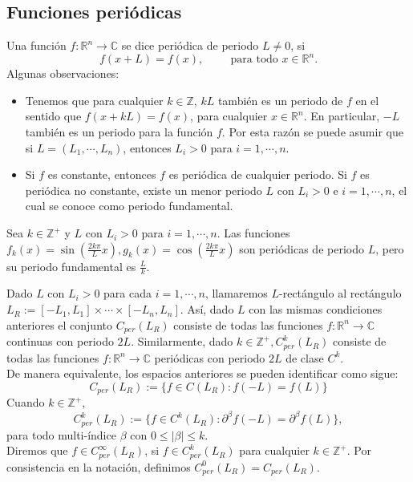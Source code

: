   \subsection{Funciones periódicas}\label{subsec:funciones-periodicas}
    Una función $f: \mathbb{R}^{n}\rightarrow \mathbb{C}$ se dice periódica de periodo $L\neq 0$, si
    $$f(x+L)=f(x),\hspace{1cm}\text{para todo $x\in\mathbb{R}^{n}$.}$$
    Algunas observaciones:
    \begin{itemize}
      \item Tenemos que para cualquier $k\in \mathbb{Z}$, $kL$ también es un periodo de $f$ en el sentido que $f(x + kL) = f(x)$, para cualquier $x \in \mathbb{R}^{n}$. En particular, $-L$ también es un periodo para la función $f$. Por esta razón se puede asumir que si $L=(L_1,\cdots,L_n)$, entonces $L_i>0$ para $i=1,\cdots,n$.
      \item Si $f$ es constante, entonces $f$ es periódica de cualquier periodo. Si $f$ es periódica no constante, existe un menor periodo $L$ con $L_i>0$ e $i=1,\cdots,n$, el cual se conoce como periodo fundamental.
    \end{itemize}
    \begin{example}
      Sea $k\in\mathbb{Z}^{+}$ y $L$ con $L_i>0$ para $i=1,\cdots,n$. Las funciones $f_k(x)=\sin\left( \frac{2k\pi}{L}x \right),g_k(x)=\cos\left( \frac{2k\pi}{L}x \right)$ son periódicas de periodo $L$, pero su periodo fundamental es $\frac{L}{k}$.  
    \end{example}
    Dado $L$ con $L_i>0$ para cada $i=1,\cdots,n$, llamaremos $L$-rectángulo al rectángulo $L_R:=[-L_1,L_1]\times\cdots\times[-L_n,L_n]$. Así, dado $L$ con las mismas condiciones anteriores el conjunto $C_{per}(L_R)$ consiste de todas las funciones $f : \mathbb{R}^{n}\rightarrow\mathbb{C}$ continuas con periodo $2L$. Similarmente, dado $k \in \mathbb{Z}^{+}, C_{per}^{k}(L_R)$ consiste de todas las funciones $f :\mathbb{R}^{n}\rightarrow\mathbb{C}$ periódicas con periodo $2L$ de clase $C^{k}$.\\
    De manera equivalente, los espacios anteriores se pueden identificar como sigue:
    $$C_{per}(L_R):=\{f\in C(L_R):f(-L)=f(L)\}$$
    Cuando $k \in \mathbb{Z}^{+}$,
    $$C_{per}^{k}(L_R):=\{f\in C^{k}(L_R):\partial^{\beta}f(-L)=\partial^{\beta}f(L)\},$$
    para todo multi-índice $\beta$ con $0\leq |\beta| \leq k$.\\
    Diremos que $f \in C_{per}^{\infty}(L_R)$, si $f \in C_{per}^{k}(L_R)$ para cualquier $k \in \mathbb{Z}^{+}$. Por consistencia en la notación, definimos $C_{per}^{0}(L_R)=C_{per}(L_R)$.\\
